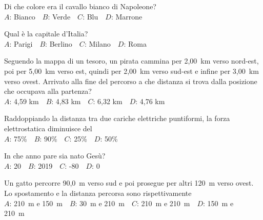\mcquestionfooter



\mcpaperfooter

\def\mcserialnumber{28}
\mcpaperheader


\def\mcquestionnumber{1}


\mcquestionheader Di che colore era il cavallo bianco di Napoleone?\\
{$A$}: Bianco\ \ {$B$}: Verde\ \ {$C$}: Blu\ \ {$D$}: Marrone\ \ 

\mcquestionfooter



\def\mcquestionnumber{2}


\mcquestionheader Qual è la capitale d’Italia?\\
{$A$}: Parigi\ \ {$B$}: Berlino\ \ {$C$}: Milano\ \ {$D$}: Roma\ \ 

\mcquestionfooter



\def\mcquestionnumber{3}


\mcquestionheader Seguendo la mappa di un tesoro, un pirata cammina per 2,00~km verso nord-est, poi per 5,00~km verso est, quindi per 2,00~km verso sud-est e infine per 3,00~km verso ovest. Arrivato alla fine del percorso a che distanza si trova dalla posizione che occupava alla partenza?\\
{$A$}: 4,59 km\ \ {$B$}: 4,83 km\ \ {$C$}: 6,32 km\ \ {$D$}: 4,76 km\ \ 

\mcquestionfooter



\def\mcquestionnumber{4}


\mcquestionheader Raddoppiando la distanza tra due cariche elettriche puntiformi, la forza elettrostatica diminuisce del\\
{$A$}: 75\%\ \ {$B$}: 90\%\ \ {$C$}: 25\%\ \ {$D$}: 50\%\ \ 

\mcquestionfooter



\def\mcquestionnumber{5}


\mcquestionheader In che anno pare sia nato Gesù?\\
{$A$}: 20\ \ {$B$}: 2019\ \ {$C$}: -80\ \ {$D$}: 0\ \ 

\mcquestionfooter



\def\mcquestionnumber{6}


\mcquestionheader Un gatto percorre 90,0~m verso sud e poi prosegue per altri 120~m verso ovest. Lo spostamento e la distanza percorsa sono rispettivamente\\
{$A$}: 210~m e 150~m\ \ {$B$}: 30~m e 210~m\ \ {$C$}: 210~m e 210~m\ \ {$D$}: 150~m e 210~m\ \ 

